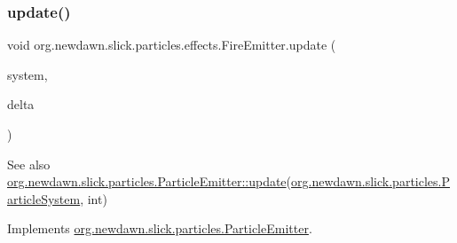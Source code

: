 \subsubsection{\texorpdfstring{update()}{update()}}
{\footnotesize\ttfamily void org.\+newdawn.\+slick.\+particles.\+effects.\+Fire\+Emitter.\+update (\begin{DoxyParamCaption}\item[{\mbox{\hyperlink{classorg_1_1newdawn_1_1slick_1_1particles_1_1_particle_system}{Particle\+System}}}]{system,  }\item[{int}]{delta }\end{DoxyParamCaption})\hspace{0.3cm}{\ttfamily [inline]}}

\begin{DoxySeeAlso}{See also}
\mbox{\hyperlink{interfaceorg_1_1newdawn_1_1slick_1_1particles_1_1_particle_emitter_a18e2a8e6264aa46fb874f992c2093e15}{org.\+newdawn.\+slick.\+particles.\+Particle\+Emitter\+::update}}(\mbox{\hyperlink{classorg_1_1newdawn_1_1slick_1_1particles_1_1_particle_system}{org.\+newdawn.\+slick.\+particles.\+Particle\+System}}, int) 
\end{DoxySeeAlso}


Implements \mbox{\hyperlink{interfaceorg_1_1newdawn_1_1slick_1_1particles_1_1_particle_emitter_a18e2a8e6264aa46fb874f992c2093e15}{org.\+newdawn.\+slick.\+particles.\+Particle\+Emitter}}.


